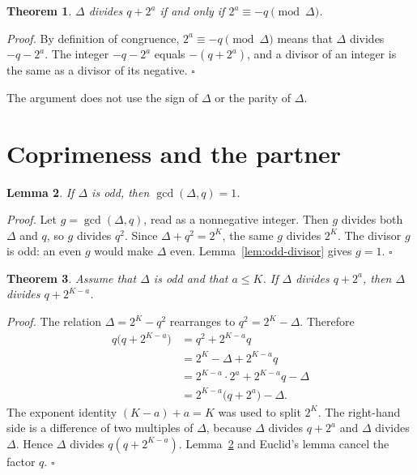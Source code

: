 \documentclass[11pt,letterpaper]{article}
\newtheorem{theorem}{Theorem}
\newtheorem{lemma}[theorem]{Lemma}
\newenvironment{proof}{\noindent\textit{Proof.}}{\hfill\(\square\)}
\begin{document}
\begin{theorem}
\label{thm:congruence}
\(\Delta\) divides \(q+2^{a}\) if and only if \(2^{a}\equiv -q\pmod{\Delta}\).
\end{theorem}

\begin{proof}
By definition of congruence, \(2^{a}\equiv -q\pmod{\Delta}\) means that \(\Delta\) divides \(-q-2^{a}\). The integer \(-q-2^{a}\) equals \(-(q+2^{a})\), and a divisor of an integer is the same as a divisor of its negative.
\end{proof}

The argument does not use the sign of \(\Delta\) or the parity of \(\Delta\).

\section{Coprimeness and the partner}

\begin{lemma}
\label{lem:coprime}
If \(\Delta\) is odd, then \(\gcd(\Delta,q)=1\).
\end{lemma}

\begin{proof}
Let \(g=\gcd(\Delta,q)\), read as a nonnegative integer. Then \(g\) divides both \(\Delta\) and \(q\), so \(g\) divides \(q^{2}\). Since \(\Delta+q^{2}=2^{K}\), the same \(g\) divides \(2^{K}\). The divisor \(g\) is odd: an even \(g\) would make \(\Delta\) even. Lemma~\ref{lem:odd-divisor} gives \(g=1\).
\end{proof}

\begin{theorem}
\label{thm:partner-divides}
Assume that \(\Delta\) is odd and that \(a\le K\). If \(\Delta\) divides \(q+2^{a}\), then \(\Delta\) divides \(q+2^{K-a}\).
\end{theorem}

\begin{proof}
The relation \(\Delta=2^{K}-q^{2}\) rearranges to \(q^{2}=2^{K}-\Delta\). Therefore
\begin{align*}
q\bigl(q+2^{K-a}\bigr)
&=q^{2}+2^{K-a}q\\
&=2^{K}-\Delta+2^{K-a}q\\
&=2^{K-a}\cdot 2^{a}+2^{K-a}q-\Delta\\
&=2^{K-a}\bigl(q+2^{a}\bigr)-\Delta.
\end{align*}
The exponent identity \((K-a)+a=K\) was used to split \(2^{K}\). The right-hand side is a difference of two multiples of \(\Delta\), because \(\Delta\) divides \(q+2^{a}\) and \(\Delta\) divides \(\Delta\). Hence \(\Delta\) divides \(q(q+2^{K-a})\). Lemma~\ref{lem:coprime} and Euclid's lemma cancel the factor \(q\).
\end{proof}
\end{document}
